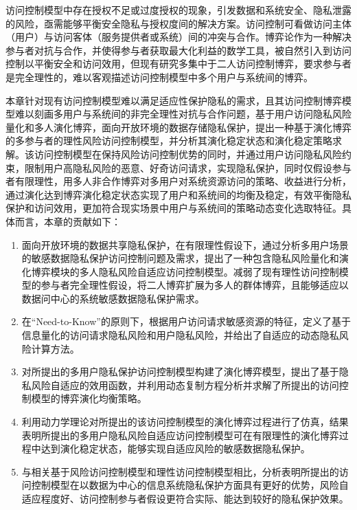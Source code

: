 访问控制模型中存在授权不足或过度授权的现象，引发数据和系统安全、隐私泄露的风险，亟需能够平衡安全隐私与授权度间的解决方案。访问控制可看做访问主体（用户）与访问客体（服务提供者或系统）间的冲突与合作。博弈论\cite{owen2001game}作为一种解决参与者对抗与合作，并使得参与者获取最大化利益的数学工具，被自然引入到访问控制以平衡安全和访问效用\cite{helil2017non,gao2018game,wang2019game}，但现有研究多集中于二人访问控制博弈，要求参与者是完全理性的，难以客观描述访问控制模型中多个用户与系统间的博弈。

本章针对现有访问控制模型难以满足适应性保护隐私的需求，且其访问控制博弈模型难以刻画多用户与系统间的非完全理性对抗与合作问题，基于用户访问隐私风险量化和多人演化博弈，面向开放环境的数据存储隐私保护，提出一种基于演化博弈的多参与者的理性风险访问控制模型，并分析其演化稳定状态和演化稳定策略求解。该访问控制模型在保持风险访问控制优势的同时，并通过用户访问隐私风险约束，限制用户高隐私风险的恶意、好奇访问请求，实现隐私保护，同时仅假设参与者有限理性，用多人非合作博弈对多用户对系统资源访问的策略、收益进行分析，通过演化达到博弈演化稳定状态实现了用户和系统间的均衡及稳定，有效平衡隐私保护和访问效用，更加符合现实场景中用户与系统间的策略动态变化选取特征。具体而言，本章的贡献如下：
\begin{enumerate}
	\item 面向开放环境的数据共享隐私保护，在有限理性假设下，通过分析多用户场景的敏感数据隐私保护访问控制问题及需求，提出了一种包含隐私风险量化和演化博弈模块的多人隐私风险自适应访问控制模型。减弱了现有理性访问控制模型的参与者完全理性假设，将二人博弈扩展为多人的群体博弈，且能够适应以数据问中心的系统敏感数据隐私保护需求。
	\item 在“Need-to-Know”的原则下，根据用户访问请求敏感资源的特征，定义了基于信息量化的访问请求隐私风险和用户隐私风险，并给出了自适应的动态隐私风险计算方法。
	\item 对所提出的多用户隐私保护访问控制模型构建了演化博弈模型，提出了基于隐私风险自适应的效用函数，并利用动态复制方程分析并求解了所提出的访问控制模型的博弈演化均衡策略。
	\item 利用动力学理论对所提出的该访问控制模型的演化博弈过程进行了仿真，结果表明所提出的多用户隐私风险自适应访问控制模型可在有限理性的演化博弈过程中达到演化稳定状态，能够实现自适应风险的敏感数据隐私保护。
	\item 与相关基于风险访问控制模型和理性访问控制模型相比，分析表明所提出的访问控制模型在以数据为中心的信息系统隐私保护方面具有更好的优势，风险自适应程度好、访问控制参与者假设更符合实际、能达到较好的隐私保护效果。
\end{enumerate}



